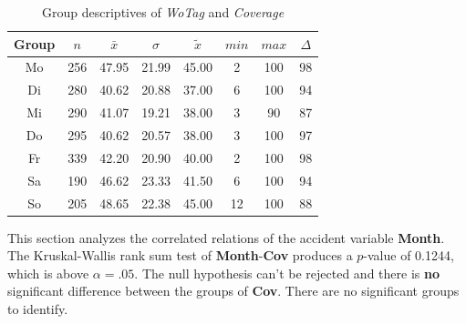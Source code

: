 \begin{table}[ht!]
	\tiny
	\centering
    \begin{tabular}{c|c|c|c|c|c|c|c}
        \toprule
        Group & $n$ & $\bar{x}$ & $\sigma$ & $\tilde{x}$ & $min$ & $max$ & $\Delta$ \\ 
        \midrule
        Mo & 256 & 47.95 & 21.99 & 45.00 & 2  & 100 & 98 \\ 
        Di & 280 & 40.62 & 20.88 & 37.00 & 6  & 100 & 94 \\ 
        Mi & 290 & 41.07 & 19.21 & 38.00 & 3  & 90  & 87 \\ 
        Do & 295 & 40.62 & 20.57 & 38.00 & 3  & 100 & 97 \\ 
        Fr & 339 & 42.20 & 20.90 & 40.00 & 2  & 100 & 98 \\ 
        Sa & 190 & 46.62 & 23.33 & 41.50 & 6  & 100 & 94 \\ 
        So & 205 & 48.65 & 22.38 & 45.00 & 12 & 100 & 88 \\ 
        \bottomrule
      \end{tabular}
	\caption{Group descriptives of \textit{WoTag} and \textit{Coverage}}
	\label{tbl:descriptives_baysis_matched_WoTag_Cov}
\end{table}

This section analyzes the correlated relations of the accident variable \textbf{Month}. The Kruskal-Wallis rank sum test of \textbf{Month}-\textbf{Cov} produces a $p$-value of 0.1244, which is above $\alpha=.05$. The null hypothesis can't be rejected and there is \textbf{no} significant difference between the groups of \textbf{Cov}. There are no significant groups to identify.

\pagebreak